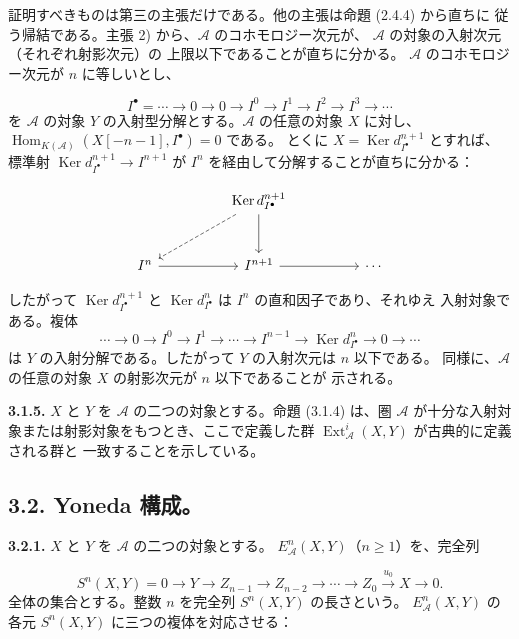 \clearpage
{}%
\begingroup\small\setlength{\parskip}{0pt}\setlength{\emergencystretch}{1.5em}
\setlength{\abovedisplayskip}{4pt plus 2pt minus 2pt}%
\setlength{\belowdisplayskip}{4pt plus 2pt minus 2pt}%

証明すべきものは第三の主張だけである。他の主張は命題 (2.4.4) から直ちに
従う帰結である。主張 2) から、$\mathcal A$ のコホモロジー次元が、
$\mathcal A$ の対象の入射次元（それぞれ射影次元）の
上限以下であることが直ちに分かる。
$\mathcal A$ のコホモロジー次元が $n$ に等しいとし、

\[
I^\bullet=\cdots\longrightarrow0\longrightarrow0\longrightarrow I^0
\longrightarrow I^1\longrightarrow I^2\longrightarrow I^3
\longrightarrow\cdots
\]
を $\mathcal A$ の対象 $Y$ の入射型分解とする。$\mathcal A$ の任意の対象
$X$ に対し、
$\operatorname{Hom}_{K(\mathcal A)}(X[-n-1],I^\bullet)=0$ である。
とくに $X=\operatorname{Ker}d_{I^\bullet}^{n+1}$ とすれば、標準射
$\operatorname{Ker}d_{I^\bullet}^{n+1}\longrightarrow I^{n+1}$ が
$I^n$ を経由して分解することが直ちに分かる：

\[
\begin{tikzcd}[column sep=4.8em,row sep=2.8em]
{} & \operatorname{Ker}d_{I^\bullet}^{n+1}
  \arrow[dl,dashed] \arrow[d] & {} \\
I^n \arrow[r] & I^{n+1} \arrow[r] & \cdots
\end{tikzcd}
\]

したがって $\operatorname{Ker}d_{I^\bullet}^{n+1}$ と
$\operatorname{Ker}d_{I^\bullet}^{n}$ は $I^n$ の直和因子であり、それゆえ
入射対象である。複体
\[
\cdots\longrightarrow0\longrightarrow I^0\longrightarrow I^1
\longrightarrow\cdots\longrightarrow I^{n-1}
\longrightarrow\operatorname{Ker}d_{I^\bullet}^{n}
\longrightarrow0\longrightarrow\cdots
\]
は $Y$ の入射分解である。したがって $Y$ の入射次元は $n$ 以下である。
同様に、$\mathcal A$ の任意の対象 $X$ の射影次元が $n$ 以下であることが
示される。

\medskip\noindent\textbf{3.1.5.}\quad
$X$ と $Y$ を $\mathcal A$ の二つの対象とする。命題 (3.1.4) は、圏
$\mathcal A$ が十分な入射対象または射影対象をもつとき、ここで定義した群
$\operatorname{Ext}_{\mathcal A}^{i}(X,Y)$ が古典的に定義される群と
一致することを示している。

\subsection*{3.2. Yoneda 構成。}

\noindent\textbf{3.2.1.}\quad
$X$ と $Y$ を $\mathcal A$ の二つの対象とする。
$E_{\mathcal A}^{n}(X,Y)$（$n\geq1$）を、完全列

\[
S^n(X,Y)=0\longrightarrow Y\longrightarrow Z_{n-1}
\longrightarrow Z_{n-2}\longrightarrow\cdots\longrightarrow Z_0
\xrightarrow{u_0}X\longrightarrow0.
\]
全体の集合とする。整数 $n$ を完全列 $S^n(X,Y)$ の長さという。
$E_{\mathcal A}^{n}(X,Y)$ の各元 $S^n(X,Y)$ に三つの複体を対応させる：
\endgroup
